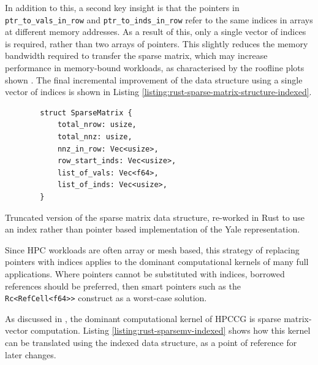 In addition to this, a second key insight is that the pointers in \texttt{ptr_to_vals_in_row} and \texttt{ptr_to_inds_in_row} refer to the same indices in arrays at different memory addresses. As a result of this, only a single vector of indices is required, rather than two arrays of pointers. This slightly reduces the memory bandwidth required to transfer the sparse matrix, which may increase performance in memory-bound workloads, as characterised by the roofline plots shown . The final incremental improvement of the data structure using a single vector of indices is shown in Listing \ref{listing:rust-sparse-matrix-structure-indexed}.

\begin{listing}[H]
    \begin{verbatim}
        struct SparseMatrix {
            total_nrow: usize,
            total_nnz: usize,
            nnz_in_row: Vec<usize>,
            row_start_inds: Vec<usize>,
            list_of_vals: Vec<f64>,
            list_of_inds: Vec<usize>,
        }
    \end{verbatim}
    \caption{Truncated version of the sparse matrix data structure, re-worked in Rust to use an index rather than pointer based implementation of the Yale representation.}
    \label{listing:rust-sparse-matrix-structure-indexed}
\end{listing}

Since \acrshort{HPC} workloads are often array or mesh based, this strategy of replacing pointers with indices applies to the dominant computational kernels of many full applications. Where pointers cannot be substituted with indices, borrowed references should be preferred, then smart pointers such as the \texttt{Rc<RefCell<f64>>} construct as a worst-case solution.

As discussed in , the dominant computational kernel of \acrshort{HPCCG} is sparse matrix-vector computation. Listing \ref{listing:rust-sparsemv-indexed} shows how this kernel can be translated using the indexed data structure, as a point of reference for later changes.

